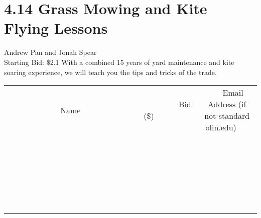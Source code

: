 \documentclass[11pt]{article}
\begin{document}
\section*{4.14 Grass Mowing and Kite Flying Lessons}
Andrew Pan and Jonah Spear
\\
Starting Bid: \$2.1
\newline
With a combined 15 years of yard maintenance and kite soaring experience, we will teach you the tips and tricks of the trade.
\\[6ex]
\begin{tabular}{c c c}
~~~~~~~~~~~~~Name~~~~~~~~~~~~~ & ~~~~~~~~~Bid (\$)~~~~~~~~~  & ~~~Email Address (if not standard olin.edu)~~~\\
 & & \\
\hline
 & & \\
\hline
 & & \\
\hline
 & & \\
\hline
 & & \\
\hline
 & & \\
\hline
 & & \\
\hline
 & & \\
\hline
 & & \\
\hline
 & & \\
\hline
 & & \\
\hline
 & & \\
\hline
 & & \\
\hline
 & & \\
\hline
 & & \\
\hline
 & & \\
\hline
 & & \\
\hline
 & & \\
\hline
 & & \\
\hline
 & & \\
\hline
 & & \\
\hline
 & & \\
\hline
 & & \\
\hline
 & & \\
\hline
 & & \\
\hline
 & & \\
\hline
\end{tabular}
\newpage
\end{document}
